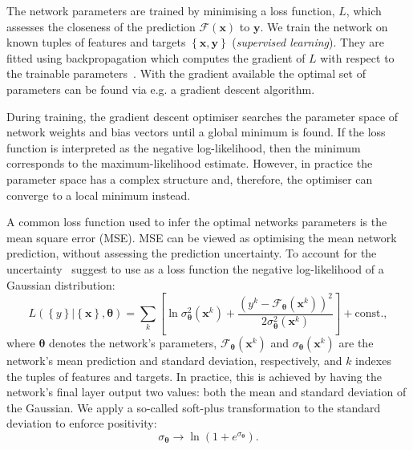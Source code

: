 \documentclass[usenatbib,useAMS]{mnras}
\begin{document}
The network parameters are trained by minimising a loss function, $L$, which assesses the closeness of the prediction $\mathcal{F}(\bm{x})$ to $\bm{y}$. We train the network on known tuples of features and targets $\left\{\bm{x}, \bm{y}\right\}$ (\emph{supervised learning}). They are fitted using backpropagation which computes the gradient of $L$ with respect to the trainable parameters~\citep{Rumelhart_backprop}. With the gradient available the optimal set of parameters can be found via e.g. a gradient descent algorithm.

During training, the gradient descent optimiser searches the parameter space of network weights and bias vectors until a global minimum is found. If the loss function is interpreted as the negative log-likelihood, then the minimum corresponds to the maximum-likelihood estimate. However, in practice the parameter space has a complex structure and, therefore, the optimiser can converge to a local minimum instead.

A common loss function used to infer the optimal networks parameters is the mean square error (MSE). MSE can be viewed as optimising the mean network prediction, without assessing the prediction uncertainty. To account for the uncertainty~\cite{Nix_mean_variance} suggest to use as a loss function the negative log-likelihood of a Gaussian distribution: 
\begin{equation}
    \label{eq:Gaussian loss function}
    L\left(\left\{y\right\} | \left\{\bm{x}\right\}, \bm{\bm{\theta}}\right) 
    =  \sum_k\left[ \ln \sigma_{\bm{\theta}}^{2}(\bm{x}^k) + \frac{\left(y^k - \mathcal{F}_{\bm{\theta}}(\bm{x}^k)\right)^2}{2\sigma_{\bm{\theta}}^{2}(\bm{x}^k)}\right] + \mathrm{const.},
\end{equation}
where $\bm{\theta}$ denotes the network's parameters, $\mathcal{F}_{\bm{\theta}} (\bm{x}^k)$ and $\sigma_{\bm{\theta}}(\bm{x}^k)$ are the network's mean prediction and standard deviation, respectively, and $k$ indexes the tuples of features and targets. In practice, this is achieved by having the network's final layer output two values: both the mean and standard deviation of the Gaussian. We apply a so-called soft-plus transformation to the standard deviation to enforce positivity:
% 
\begin{equation}
    \sigma_{\bm{\theta}} \to \ln \left( 1 + e^{\sigma_{\bm{\theta}}} \right).
\end{equation}
\end{document}
